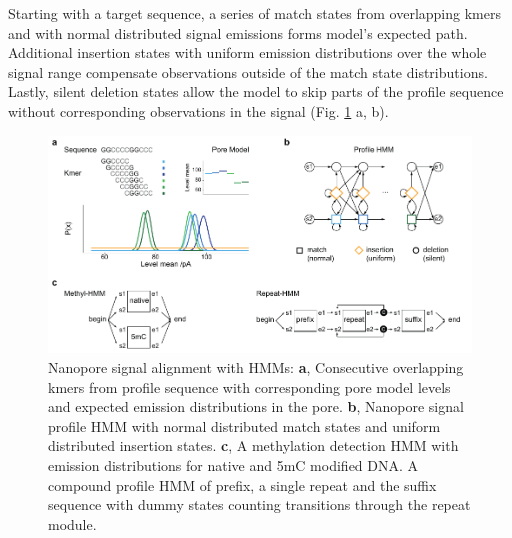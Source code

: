 Starting with a target sequence, a series of match states from overlapping kmers and with normal distributed signal emissions forms model's expected path. Additional insertion states with uniform emission distributions over the whole signal range compensate observations outside of the match state distributions. 
Lastly, silent deletion states allow the model to skip parts of the profile sequence without corresponding observations in the signal (Fig. \ref{fig:strique:count_hmm} a, b).

\begin{figure}[h]
	\centering
	\includegraphics[width=1.0\textwidth]{figures/signal/count_hmm.pdf}
	\captionsetup{format=plain}
	\caption[Nanopore signal alignment with HMMs]{Nanopore signal alignment with HMMs: \textbf{a}, Consecutive overlapping kmers from profile sequence with corresponding pore model levels and expected emission distributions in the pore. \textbf{b}, Nanopore signal profile HMM with normal distributed match states and uniform distributed insertion states. \textbf{c}, A methylation detection HMM with emission distributions for native and 5mC modified DNA. A compound profile HMM of prefix, a single repeat and the suffix sequence with dummy states counting transitions through the repeat module.}
	\label{fig:strique:count_hmm}
\end{figure}

